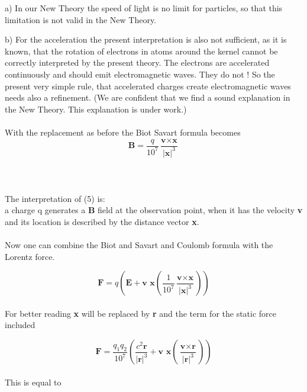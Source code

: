 \documentclass[10pt,titlepage]{article}
\begin{document}
a) In our New Theory the speed of light is no limit for particles, so that this limitation is not valid in the New Theory. 

b) For the acceleration the present interpretation is also not sufficient, as it is known, that the rotation of electrons in atoms around the kernel cannot be correctly interpreted by the present theory. The electrons are accelerated continuously and should emit electromagnetic waves. They do not ! So the present very simple rule, that accelerated charges create electromagnetic waves needs also a refinement. 
(We are confident that we find a sound explanation in the New Theory. This explanation is under work.)\\
\\
With the replacement as before the Biot Savart formula becomes
\begin{equation}
\textbf{B} = \frac{q}{10^7} \frac{\textbf{v} \times \textbf{x}}{\vert\textbf{x}\vert^3}
\end{equation}\\
\\
\\
The interpretation of (5) is:\\
a charge q generates a \textbf{B} field at the observation point, when it has the velocity \textbf{v} and its location is described by the distance vector \textbf{x}.
\\
\\
Now one can combine the Biot and Savart and Coulomb formula with the Lorentz force.

\begin{equation}
\textbf{F} = q(\textbf{E}+\textbf{v }\textbf{x}(\frac{1}{10^7} \frac{\textbf{v} \times \textbf{x}}{\vert\textbf{x}\vert^3}))
\end{equation}\\

For better reading \textbf{x} will be replaced by  \textbf{r} and the term for the static force included

\begin{equation}
\textbf{F} = \frac{{q_1}{q_2}}{{10^7}}( \frac{c^2\textbf{r}}{\vert\textbf{r}\vert^3}+\textbf{v }\textbf{x}( \frac{\textbf{v} \times  \textbf{r}}{\vert\textbf{r}\vert^3}))
\end{equation}\\

This is equal to
\end{document}
